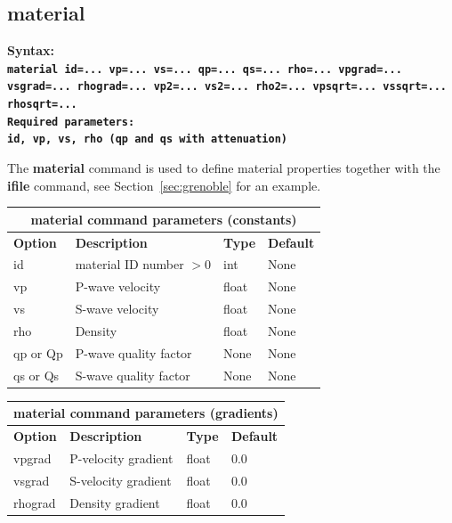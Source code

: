 \documentclass[11pt]{report}
\begin{document}
\subsection{material}
\label{keyword:material}
\begin{flushleft}\bf
Syntax:\\
\tt material
id=... vp=... vs=... qp=... qs=... rho=... vpgrad=... vsgrad=... rhograd=... vp2=... vs2=... rho2=... vpsqrt=... vssqrt=... rhosqrt=...\\ 
\bf Required parameters:\\
\tt id, vp, vs, rho (qp and qs with attenuation)
\end{flushleft}
The {\bf material} command is used to define material properties together with the {\bf ifile}
command, see Section~\ref{sec:grenoble} for an example.
\begin{center}
\begin{tabular}{|l|p{8cm}|l|l|} \hline
\multicolumn{4}{|c|}{\bf material command parameters (constants)}\\ \hline
\bf{Option} & \bf{Description} & \bf{Type} & \bf{Default} \\ \hline \hline
id & material ID number $>0$         & int & None  \\ \hline
vp & P-wave velocity & float & None \\ \hline
vs & S-wave velocity & float & None \\ \hline
rho & Density & float & None \\ \hline
qp or Qp & P-wave quality factor & None & None \\ \hline
qs or Qs & S-wave quality factor & None & None \\ \hline
\end{tabular}
\end{center}
\begin{center}
\begin{tabular}{|l|p{8cm}|l|l|} \hline
\multicolumn{4}{|c|}{\bf material command parameters (gradients)}\\ \hline
\bf{Option} & \bf{Description} & \bf{Type} & \bf{Default} \\ \hline \hline
vpgrad & P-velocity gradient & float & 0.0 \\ \hline
vsgrad & S-velocity gradient & float & 0.0 \\ \hline
rhograd & Density gradient   & float & 0.0 \\ \hline
\end{tabular}
\end{center}
\end{document}
